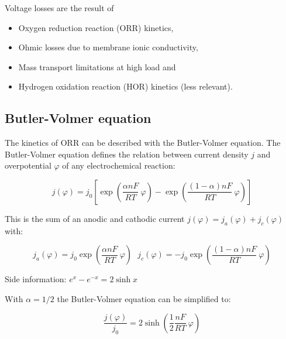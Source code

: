 \documentclass[11pt,a4paper,english,twoside]{scrreprt}
\begin{document}
Voltage losses are the result of
\begin{itemize}
	\item Oxygen reduction reaction (ORR) kinetics,
	\item Ohmic losses due to membrane ionic conductivity,
	\item Mass transport limitations at high load and
	\item Hydrogen oxidation reaction (HOR) kinetics (less relevant).
\end{itemize}



\subsection{Butler-Volmer equation}
\label{sec:ButlerVolmer}

The kinetics of ORR can be described with the Butler-Volmer equation. The Butler-Volmer equation defines the relation between current density $j$ and overpotential $\varphi$ of any electrochemical reaction:

\[
j(\varphi) = j_0 \left[\exp\left(\frac{\alpha n F}{RT}\: \varphi \right) - \exp\left(\frac{(1-\alpha) n F}{RT}\: \varphi \right) \right]
\]

This is the sum of an anodic and cathodic current $j(\varphi) = j_a(\varphi) + j_c(\varphi)$ with:

\[
j_a(\varphi) = j_0 \exp\left(\frac{\alpha n F}{RT}\: \varphi \right) \ \ \
j_c(\varphi) = - j_0 \exp\left(\frac{(1-\alpha) n F}{RT}\: \varphi \right)
\]

Side information: $e^x - e^{-x} = 2 \sinh x$

With $\alpha = 1/2$ the Butler-Volmer equation can be simplified to:

\[
\frac{j(\varphi)}{j_0} = 2 \sinh \left( \frac12 \frac{n F}{RT}\: \varphi \right) 
\]
\end{document}
